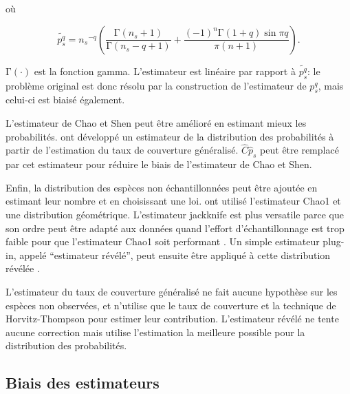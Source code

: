 \documentclass[
  11pt,
  french,
  a4paper,
  extrafontsizes,onecolumn,openright
  ]{memoir}
\newlength{\rf}
\begin{document}
où

\begin{equation}
  \label{eq:Estpqs}
  \widetilde{p^q_s}
  = {n_s}^{-q} \left(
    \frac{\mathrm{\Gamma}\left(n_s +1\right)}{\mathrm{\Gamma}\left(n_s -q+1\right)}
    + \frac{{\left(-1\right)}^n \mathrm{\Gamma}\left(1+q\right)\sin{\pi q}}{\pi\left(n+1\right)}  \right).
\end{equation}

\(\mathrm{\Gamma}\left(\cdot\right)\) est la fonction gamma.
L'estimateur est linéaire par rapport à \(\widetilde{p^q_s}\): le problème original est donc résolu par la construction de l'estimateur de \(p^q_s\), mais celui-ci est biaisé également.

L'estimateur de Chao et Shen peut être amélioré \autocite{Marcon2015a} en estimant mieux les probabilités.
\textcite{Chao2014c} ont développé un estimateur de la distribution des probabilités à partir de l'estimation du taux de couverture généralisé.
\(\hat{C}{\hat{p}}_s\) peut être remplacé par cet estimateur pour réduire le biais de l'estimateur de Chao et Shen.

Enfin, la distribution des espèces non échantillonnées peut être ajoutée en estimant leur nombre et en choisissant une loi.
\textcite{Chao2014c} ont utilisé l'estimateur Chao1 et une distribution géométrique.
L'estimateur jackknife \autocite{Burnham1979} est plus versatile parce que son ordre peut être adapté aux données quand l'effort d'échantillonnage est trop faible pour que l'estimateur Chao1 soit performant \autocite{Brose2003}.
Un simple estimateur plug-in, appelé \enquote{estimateur révélé}, peut ensuite être appliqué à cette distribution révélée \autocite{Marcon2015a}.

L'estimateur du taux de couverture généralisé ne fait aucune hypothèse sur les espèces non observées, et n'utilise que le taux de couverture et la technique de Horvitz-Thompson pour estimer leur contribution.
L'estimateur révélé ne tente aucune correction mais utilise l'estimation la meilleure possible pour la distribution des probabilités.

\hypertarget{biais-des-estimateurs}{%
\subsection{Biais des estimateurs}\label{biais-des-estimateurs}}
\end{document}
